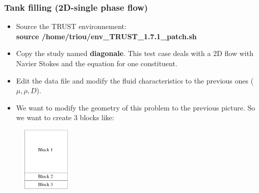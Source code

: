 \documentclass[10pt]{beamer}
\begin{document}
\begin{frame}
\frametitle{Tank filling (2D-single phase flow)}
\begin{block}{}

\begin{itemize}
\item Source the TRUST environnement:\\
\textbf{source /home/triou/env\_TRUST\_1.7.1\_patch.sh}
\item Copy the study named \textbf{diagonale}. This test case deals with a 2D flow with Navier Stokes and the equation for one constituent.
\item Edit the data file and modify the fluid characteristics to the previous ones ($\mu, \rho, D$).
\item We want to modify the geometry of this problem to the previous picture. So we want to create 3 blocks like:
\end{itemize}

\begin{figure}
\includegraphics[width=0.2\textwidth]{PICTURES/tank2D_2.pdf}
\end{figure}

\end{block}
\end{frame}
\end{document}
